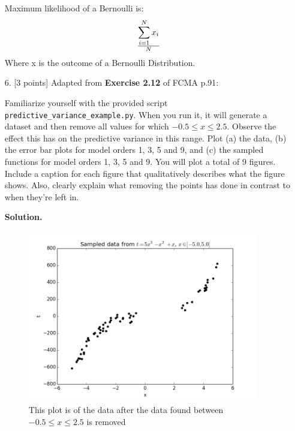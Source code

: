 \documentclass[10pt]{article}
\begin{document}
\begin{itemize}
Maximum likelihood of a Bernoulli is: \[ {\sum_{i=1}^{N} x_i} \over N \]
Where x is the outcome of a Bernoulli Distribution.



\item[6.] [3 points]
Adapted from {\bf Exercise 2.12} of FCMA p.91:

Familiarize yourself with the provided script {\tt predictive\_variance\_example.py}.  When you run it, it will generate a dataset and then remove all values for which $-0.5 \leq x \leq 2.5$.  Observe the effect this has on the predictive variance in this range.  Plot (a) the data, (b) the error bar plots for model orders 1, 3, 5 and 9, and (c) the sampled functions for model orders 1, 3, 5 and 9.  You will plot a total of 9 figures.  Include a caption for each figure that qualitatively describes what the figure shows.  Also, clearly explain what removing the points has done in contrast to when they're left in.

{\bf Solution.}

\begin{figure}[htb]
\begin{center}
\includegraphics[width=10cm]{figure_6.png}
\caption{This plot is of the data after the data found between $-0.5 \le x \le 2.5$ is removed}
\end{center}
\end{figure}


\end{itemize}
\end{document}
